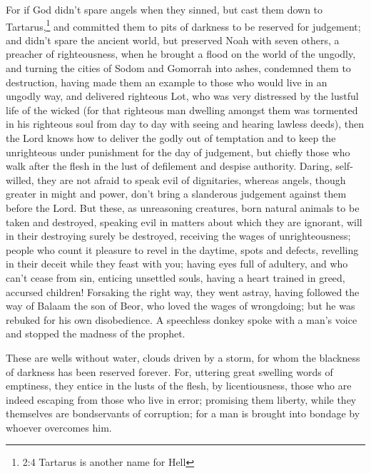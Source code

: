  For if God didn't spare angels when they sinned, but cast
them down to Tartarus,\footnote{2:4 Tartarus is another name for Hell}
and committed them to pits of darkness to be reserved for judgement;
 and didn't spare the ancient world, but preserved Noah with
seven others, a preacher of righteousness, when he brought a flood on
the world of the ungodly,  and turning the cities of Sodom
and Gomorrah into ashes, condemned them to destruction, having made them
an example to those who would live in an ungodly way,  and
delivered righteous Lot, who was very distressed by the lustful life of
the wicked  (for that righteous man dwelling amongst them
was tormented in his righteous soul from day to day with seeing and
hearing lawless deeds),  then the Lord knows how to deliver
the godly out of temptation and to keep the unrighteous under punishment
for the day of judgement,  but chiefly those who walk after
the flesh in the lust of defilement and despise authority. Daring,
self-willed, they are not afraid to speak evil of dignitaries,
 whereas angels, though greater in might and power, don't
bring a slanderous judgement against them before the Lord. 
But these, as unreasoning creatures, born natural animals to be taken
and destroyed, speaking evil in matters about which they are ignorant,
will in their destroying surely be destroyed,  receiving
the wages of unrighteousness; people who count it pleasure to revel in
the daytime, spots and defects, revelling in their deceit while they
feast with you;  having eyes full of adultery, and who
can't cease from sin, enticing unsettled souls, having a heart trained
in greed, accursed children!  Forsaking the right way, they
went astray, having followed the way of Balaam the son of Beor, who
loved the wages of wrongdoing;  but he was rebuked for his
own disobedience. A speechless donkey spoke with a man's voice and
stopped the madness of the prophet.

 These are wells without water, clouds driven by a storm,
for whom the blackness of darkness has been reserved forever.
 For, uttering great swelling words of emptiness, they
entice in the lusts of the flesh, by licentiousness, those who are
indeed escaping from those who live in error;  promising
them liberty, while they themselves are bondservants of corruption; for
a man is brought into bondage by whoever overcomes him.

